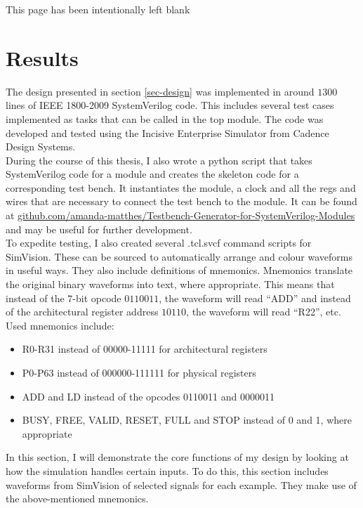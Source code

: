 \documentclass[12pt,a4paper]{article} %
\begin{document}
\newpage
\begin{center}
	This page has been intentionally left blank 
\end{center}

\newpage
\section{Results} \label{sec-results}
The design presented in section \ref{sec-design} was implemented in around $1300$ lines of IEEE 1800-2009 SystemVerilog code. This includes several test cases implemented as tasks that can be called in the top module. The code was developed and tested using the Incisive Enterprise Simulator from Cadence Design Systems. \\

During the course of this thesis, I also wrote a python script that takes SystemVerilog code for a module and creates the skeleton code for a corresponding test bench. It instantiates the module, a clock and all the regs and wires that are necessary to connect the test bench to the module. It can be found at \url{github.com/amanda-matthes/Testbench-Generator-for-SystemVerilog-Modules} and may be useful for further development.\\

To expedite testing, I also created several .tcl.svcf command scripts for SimVision. These can be sourced to automatically arrange and colour waveforms in useful ways. They also include definitions of mnemonics. Mnemonics translate the original binary waveforms into text, where appropriate. This means that instead of the 7-bit opcode $0110011$, the waveform will read ``ADD'' and instead of the architectural register address $10110$, the waveform will read ``R22'', etc. Used mnemonics include:
\begin{itemize}
	\item R0-R31 instead of 00000-11111 for architectural registers
	\item P0-P63 instead of 000000-111111 for physical registers
	\item ADD and LD instead of the opcodes 0110011 and 0000011 \cite[p.~104f]{riscv}
	\item BUSY, FREE, VALID, RESET, FULL and STOP instead of 0 and 1, where appropriate\\
\end{itemize}

In this section, I will demonstrate the core functions of my design by looking at how the simulation handles certain inputs. To do this, this section includes waveforms from SimVision of selected signals for each example. They make use of the above-mentioned mnemonics.
\end{document}
